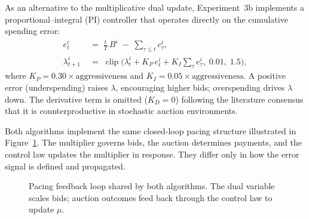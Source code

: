 As an alternative to the multiplicative dual update, Experiment~3b implements a proportional--integral (PI) controller that operates directly on the cumulative spending error:
\begin{align}
e_t^i &\;=\; \tfrac{t}{T}\,B^i \;-\; {\textstyle\sum_{\tau \le t}} c_\tau^i, \label{eq:pid_error}\\
\lambda_{t+1}^i &\;=\; \operatorname{clip}\!\bigl(\lambda_t^i + K_P\,e_t^i + K_I\!\textstyle\sum_{\tau} e_\tau^i,\; 0.01,\; 1.5\bigr), \label{eq:pid_update}
\end{align}
where $K_P = 0.30\times\text{aggressiveness}$ and $K_I = 0.05\times\text{aggressiveness}$. A positive error (underspending) raises $\lambda$, encouraging higher bids; overspending drives $\lambda$ down. The derivative term is omitted ($K_D = 0$) following the literature consensus that it is counterproductive in stochastic auction environments.

Both algorithms implement the same closed-loop pacing structure illustrated in Figure~\ref{fig:pacing_loop}. The multiplier governs bids, the auction determines payments, and the control law updates the multiplier in response. They differ only in how the error signal is defined and propagated.

\begin{figure}[H]
\centering
{}
\caption{Pacing feedback loop shared by both algorithms. The dual variable scales bids; auction outcomes feed back through the control law to update $\mu$.}
\label{fig:pacing_loop}
\end{figure}

